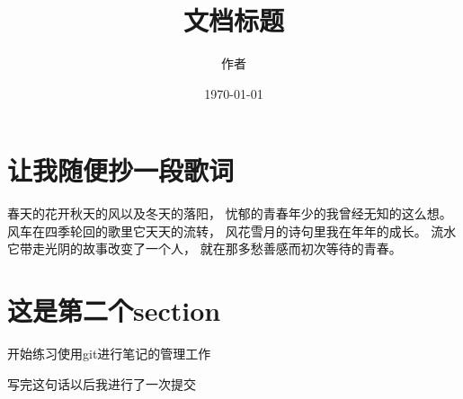 \documentclass[UTF8]{ctexart}
\title{文档标题}
\author{作者}
\date{\today}
\begin{document}
\maketitle
\tableofcontents
\section{让我随便抄一段歌词}
春天的花开秋天的风以及冬天的落阳，
忧郁的青春年少的我曾经无知的这么想。
风车在四季轮回的歌里它天天的流转，
风花雪月的诗句里我在年年的成长。
流水它带走光阴的故事改变了一个人，
就在那多愁善感而初次等待的青春。

\section{这是第二个section}
开始练习使用git进行笔记的管理工作

写完这句话以后我进行了一次提交

\end{document}
